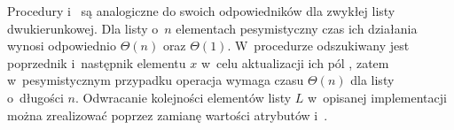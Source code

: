 Procedury  i~ są analogiczne do swoich odpowiedników dla zwykłej listy dwukierunkowej.
Dla listy o~$n$ elementach pesymistyczny czas ich działania wynosi odpowiednio $\Theta(n)$ oraz $\Theta(1)$.
W~procedurze  odszukiwany jest poprzednik i~następnik elementu $x$ w~celu aktualizacji ich pól , zatem w~pesymistycznym przypadku operacja wymaga czasu $\Theta(n)$ dla listy o~długości $n$.
Odwracanie kolejności elementów listy $L$ w~opisanej implementacji można zrealizować poprzez zamianę wartości atrybutów  i~.
